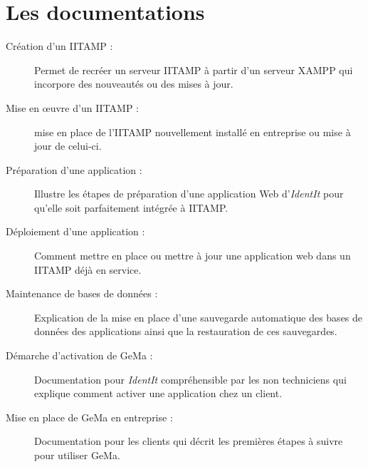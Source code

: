\section{Les documentations} %
\label{sec:Les documentations}

\begin{description}

  \item[Création d'un IITAMP :] Permet de recréer un serveur IITAMP à
    partir d'un serveur XAMPP qui incorpore des nouveautés ou des mises
    à jour.

  \item[Mise en \oe{}uvre d'un IITAMP :] mise en place de l'IITAMP
    nouvellement installé en entreprise ou mise à jour de celui-ci.

  \item[Préparation d'une application :] Illustre les étapes de
    préparation d'une application Web d'\emph{IdentIt} pour qu'elle soit
    parfaitement intégrée à IITAMP.

  \item[Déploiement d'une application :] Comment mettre en place ou
    mettre à jour une application web dans un IITAMP déjà en service.

  \item[Maintenance de bases de données :] Explication de la mise en
    place d'une sauvegarde automatique des bases de données des
    applications ainsi que la restauration de ces sauvegardes.

  \item[Démarche d'activation de GeMa :] Documentation pour
    \emph{IdentIt} compréhensible par les non techniciens qui explique
    comment activer une application chez un client.

  \item[Mise en place de GeMa en entreprise :] Documentation pour les
    clients qui décrit les premières étapes à suivre pour utiliser GeMa.

\end{description}
